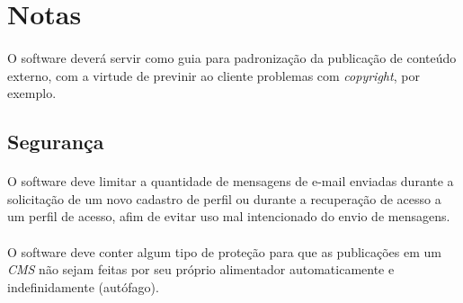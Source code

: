 \documentclass[a4paper,12pt]{article}
\def\cms{\emph{CMS}}
\begin{document}
\section{Notas}

\paragraph{}
O software deverá servir como guia para padronização da publicação de conteúdo externo, com a virtude de previnir ao cliente problemas com \emph{copyright}, por exemplo.

\subsection{Segurança}

\paragraph{}
O software deve limitar a quantidade de mensagens de e-mail enviadas durante a solicitação de um novo cadastro de perfil ou durante a recuperação de acesso a um perfil de acesso, afim de evitar uso mal intencionado do envio de mensagens.
\paragraph{}
O software deve conter algum tipo de proteção para que as publicações em um \cms{} não sejam feitas por seu próprio alimentador automaticamente e indefinidamente (autófago).
\end{document}
